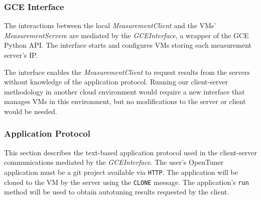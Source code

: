 \subsubsection{GCE Interface}
\label{sec:gce}

The interactions between the local \emph{MeasurementClient} and the VMs'
\emph{MeasurementServer}s are mediated by the \emph{GCEInterface}, a wrapper of
the GCE Python API.  The interface starts and configures VMs storing each
measurement server's IP.

The interface enables the \emph{MeasurementClient} to request results from the
servers without knowledge of the application protocol. Running our
client-server methodology in another cloud environment would require a new
interface that manages VMs in this environment, but no modifications to the
server or client would be needed.

\subsubsection{Application Protocol}
\label{sec:app}

This section describes the text-based application protocol used in the
client-server communications mediated by the \emph{GCEInterface}. The user's
OpenTuner application must be a git project available via
\texttt{\footnotesize{HTTP}}. The application will be cloned to the VM by the
server using the \texttt{\footnotesize CLONE} message.  The application's
\texttt{\footnotesize run} method will be used to obtain autotuning results
requested by the client.

